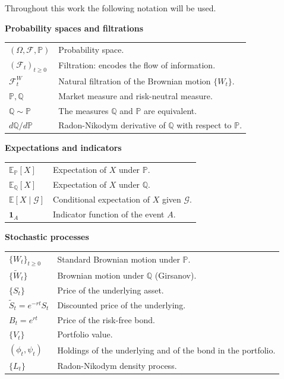 \documentclass[11pt,a4paper,oneside]{report}
\theoremstyle{plain}
\theoremstyle{definition}
\theoremstyle{remark}
\newcommand{\E}{\mathbb{E}}
\newcommand{\PP}{\mathbb{P}}
\newcommand{\Q}{\mathbb{Q}}
\newcommand{\F}{\mathcal{F}}
\newcommand{\G}{\mathcal{G}}
\newcommand{\1}{\mathbf{1}}
\begin{document}
Throughout this work the following notation will be used.

\vspace{0.3cm}

\noindent\textbf{Probability spaces and filtrations}
\begin{center}
\begin{tabular}{@{}p{4cm}p{10cm}@{}}
$(\Omega, \F, \PP)$ & Probability space. \\
$(\F_t)_{t \geq 0}$ & Filtration: encodes the flow of information. \\
$\F_t^W$ & Natural filtration of the Brownian motion $\{W_t\}$. \\
$\PP, \Q$ & Market measure and risk-neutral measure. \\
$\Q \sim \PP$ & The measures $\Q$ and $\PP$ are equivalent. \\
$d\Q/d\PP$ & Radon-Nikodym derivative of $\Q$ with respect to $\PP$. \\
\end{tabular}
\end{center}

\vspace{0.2cm}

\noindent\textbf{Expectations and indicators}
\begin{center}
\begin{tabular}{@{}p{4cm}p{10cm}@{}}
$\E_\PP[X]$ & Expectation of $X$ under $\PP$. \\
$\E_\Q[X]$ & Expectation of $X$ under $\Q$. \\
$\E[X \mid \G]$ & Conditional expectation of $X$ given $\G$. \\
$\1_A$ & Indicator function of the event $A$. \\
\end{tabular}
\end{center}

\vspace{0.2cm}

\noindent\textbf{Stochastic processes}
\begin{center}
\begin{tabular}{@{}p{4cm}p{10cm}@{}}
$\{W_t\}_{t \geq 0}$ & Standard Brownian motion under $\PP$. \\
$\{\widetilde W_t\}$ & Brownian motion under $\Q$ (Girsanov). \\
$\{S_t\}$ & Price of the underlying asset. \\
$\widetilde S_t = e^{-rt} S_t$ & Discounted price of the underlying. \\
$B_t = e^{rt}$ & Price of the risk-free bond. \\
$\{V_t\}$ & Portfolio value. \\
$(\phi_t, \psi_t)$ & Holdings of the underlying and of the bond in the portfolio. \\
$\{L_t\}$ & Radon-Nikodym density process. \\
\end{tabular}
\end{center}
\end{document}
